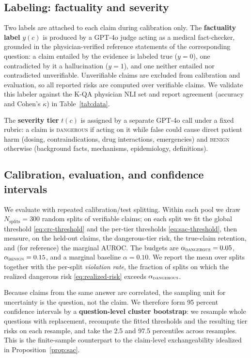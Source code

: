 \subsection{Labeling: factuality and severity}
\label{sec:labeling}
Two labels are attached to each claim during calibration only. The \textbf{factuality
label} $y(c)$ is produced by a GPT-4o judge acting as a medical fact-checker,
grounded in the physician-verified reference statements of the corresponding
question: a claim entailed by the evidence is labeled true ($y=0$), one contradicted
by it a hallucination ($y=1$), and one neither entailed nor contradicted
unverifiable. Unverifiable claims are excluded from calibration and evaluation, so
all reported risks are computed over verifiable claims. We validate this labeler
against the K-QA physician NLI set and report agreement (accuracy and Cohen's
$\kappa$) in Table~\ref{tab:data}. %

The \textbf{severity tier} $t(c)$ is assigned by a separate GPT-4o call under a fixed
rubric: a claim is \textsc{dangerous} if acting on it while false could cause direct
patient harm (dosing, contraindications, drug interactions, emergencies) and
\textsc{benign} otherwise (background facts, mechanisms, epidemiology, definitions).

\subsection{Calibration, evaluation, and confidence intervals}
\label{sec:setup-eval}
We evaluate with repeated calibration/test splitting. Within each pool we draw
$N_{\text{splits}} = 300$ random splits of verifiable claims; on each split we fit the
global threshold \eqref{eq:crc-threshold} and the per-tier thresholds
\eqref{eq:sac-threshold}, then measure, on the held-out claims, the dangerous-tier
risk, the true-claim retention, and (for reference) the marginal AUROC. The budgets
are $\alpha_{\textsc{dangerous}} = 0.05$, $\alpha_{\textsc{benign}} = 0.15$, and a
marginal baseline $\alpha = 0.10$. We report the mean over splits together with the
per-split \emph{violation rate}, the fraction of splits on which the realized
dangerous risk \eqref{eq:realized-risk} exceeds $\alpha_{\textsc{dangerous}}$.

Because claims from the same answer are correlated, the sampling unit for uncertainty
is the question, not the claim. We therefore form 95 percent confidence intervals by
a \textbf{question-level cluster bootstrap}: we resample whole questions with
replacement, recompute the fitted thresholds and the resulting tier risks on each
resample, and take the 2.5 and 97.5 percentiles across resamples. This is the
finite-sample counterpart to the claim-level exchangeability idealized in
Proposition~\ref{prop:sac}.

